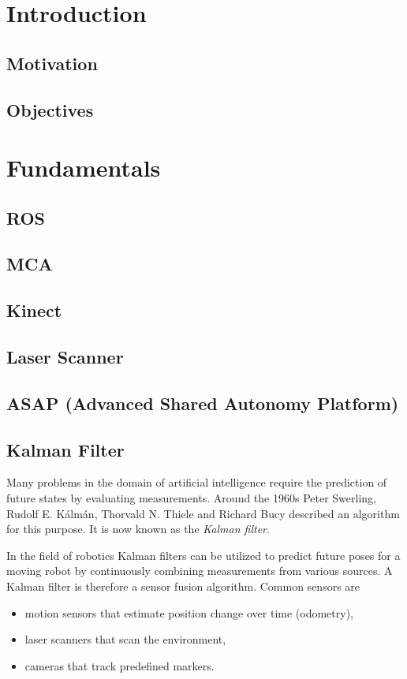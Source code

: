 \chapter{Introduction}
\section{Motivation}

\section{Objectives}

\chapter{Fundamentals}
\section{ROS}
\section{MCA}
\section{Kinect}
\section{Laser Scanner}
\section{ASAP (Advanced Shared Autonomy Platform)}

\section{Kalman Filter}
Many problems in the domain of artificial intelligence require the prediction of future states by evaluating measurements. Around the 1960s Peter Swerling, Rudolf E. Kálmán, Thorvald N. Thiele and Richard Bucy described an algorithm for this purpose. It is now known as the \textit{Kalman filter}.

In the field of robotics Kalman filters can be utilized to predict future poses for a moving robot by continuously combining measurements from various sources. A Kalman filter is therefore a sensor fusion algorithm. Common sensors are
 
\begin{itemize}
\item motion sensors that estimate position change over time (odometry),
\item laser scanners that scan the environment,
\item cameras that track predefined markers. 
\end{itemize}

